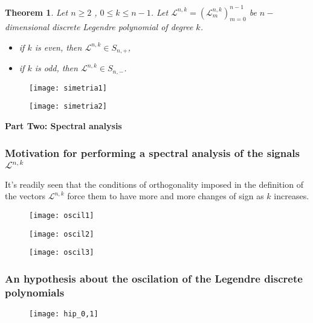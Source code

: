 \documentclass[]{beamer}
\newtheorem{teo}{\bf Theorem}
\theoremstyle{definition}
\newcommand{\cali}[1]{\mathcal{#1}} %
\begin{document}
\begin{frame}
\begin{teo}
Let $n \geq 2$ , $0 \leq k \leq n-1$. Let 
$\cali{L}^{n,k} = (\cali{L}^{n,k}_{m})_{m=0}^{n-1}$ be
$n-$dimensional discrete Legendre polynomial of degree $k$. 
\begin{itemize}
	\item if $k$ is even, then $\cali{L}^{n,k} \in S_{n,+}$,
	\item if $k$ is odd, then $\cali{L}^{n,k} \in S_{n,-}$.
\end{itemize}
\end{teo}
\begin{figure}[h]
\texttt{[image: simetria1]}
\end{figure}
\begin{figure}[h]
\texttt{[image: simetria2]}
\end{figure}
\end{frame}


\begin{frame}
\Huge{
\textbf{
Part Two: Spectral analysis
}}
\end{frame}

\begin{frame}
\frametitle{Motivation for performing a spectral analysis of the signals $\cali{L}^{n,k}$}
It's readily seen that the conditions of orthogonality imposed in the definition
of the vectors $\cali{L}^{n,k}$ force them to have more and more changes of sign as
$k$ increases.
\begin{figure}[h]
\texttt{[image: oscil1]}
\end{figure}
\end{frame}

\begin{frame}
\begin{figure}[h]
\texttt{[image: oscil2]}
\end{figure}
\end{frame}

\begin{frame}
\begin{figure}[h]
\texttt{[image: oscil3]}
\end{figure}
\end{frame}


\begin{frame}
\frametitle{An hypothesis about the oscilation of the Legendre discrete polynomials}
\begin{figure}[h]
\texttt{[image: hip\_0,1]}
\end{figure}
\end{frame}
\end{document}

